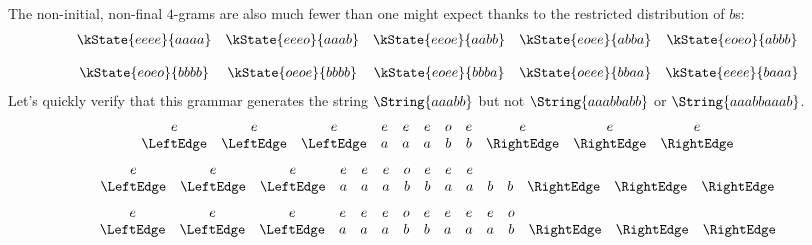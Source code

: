 \begin{examplebox}
\[    \]
    The non-initial, non-final $4$-grams are also much fewer than one might expect thanks to the restricted distribution of $b$s:
    \[
        \begin{array}{ccccc}
            \kState{eeee}{aaaa} &
            \kState{eeeo}{aaab} &
            \kState{eeoe}{aabb} &
            \kState{eoee}{abba} &
            \kState{eoeo}{abbb}
            \\[12pt]
            \kState{eoeo}{bbbb} &
            \kState{oeoe}{bbbb} &
            \kState{eoee}{bbba} &
            \kState{oeee}{bbaa} &
            \kState{eeee}{baaa}
        \end{array}
    \]
    Let's quickly verify that this grammar generates the string $\String{aaabb}$ but not $\String{aaabbabb}$ or $\String{aaabbaaab}$.
    \[
        \begin{array}{ccccccccccc}
                e & e & e & e & e & e & o & e & e & e & e\\
                \LeftEdge & \LeftEdge & \LeftEdge & a & a & a & b & b & \RightEdge & \RightEdge & \RightEdge
        \end{array}
    \]
    \[ 
        \begin{array}{ccccccccccccccc}
                e & e & e & e & e & e & o & e & e & e & & & & &\\
                \LeftEdge & \LeftEdge & \LeftEdge & a & a & a & b & b & a & a & b & b &\RightEdge & \RightEdge & \RightEdge
        \end{array}
    \]
    \[ 
        \begin{array}{ccccccccccccccc}
                e & e & e & e & e & e & o & e & e & e & e & o & & &\\
                \LeftEdge & \LeftEdge & \LeftEdge & a & a & a & b & b & a & a & a & b &\RightEdge & \RightEdge & \RightEdge
        \end{array}
    \]
    

\end{examplebox}

